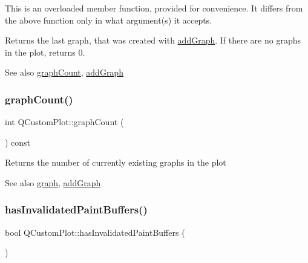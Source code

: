 This is an overloaded member function, provided for convenience. It differs from the above function only in what argument(s) it accepts.

Returns the last graph, that was created with \mbox{\hyperlink{class_q_custom_plot_a6fb2873d35a8a8089842d81a70a54167}{add\+Graph}}. If there are no graphs in the plot, returns 0.

\begin{DoxySeeAlso}{See also}
\mbox{\hyperlink{class_q_custom_plot_a5e1787cdde868c4d3790f9ebc8207d90}{graph\+Count}}, \mbox{\hyperlink{class_q_custom_plot_a6fb2873d35a8a8089842d81a70a54167}{add\+Graph}} 
\end{DoxySeeAlso}
\mbox{\label{class_q_custom_plot_a5e1787cdde868c4d3790f9ebc8207d90}} 
\subsubsection{\texorpdfstring{graph\+Count()}{graphCount()}}
{\footnotesize\ttfamily int Q\+Custom\+Plot\+::graph\+Count (\begin{DoxyParamCaption}{ }\end{DoxyParamCaption}) const}

Returns the number of currently existing graphs in the plot

\begin{DoxySeeAlso}{See also}
\mbox{\hyperlink{class_q_custom_plot_a6ecae130f684b25276fb47bd3a5875c6}{graph}}, \mbox{\hyperlink{class_q_custom_plot_a6fb2873d35a8a8089842d81a70a54167}{add\+Graph}} 
\end{DoxySeeAlso}
\mbox{\label{class_q_custom_plot_ad452b582348c8e99462d83fe1cd0279b}} 
\subsubsection{\texorpdfstring{has\+Invalidated\+Paint\+Buffers()}{hasInvalidatedPaintBuffers()}}
{\footnotesize\ttfamily bool Q\+Custom\+Plot\+::has\+Invalidated\+Paint\+Buffers (\begin{DoxyParamCaption}{ }\end{DoxyParamCaption})\hspace{0.3cm}{\ttfamily [protected]}}

